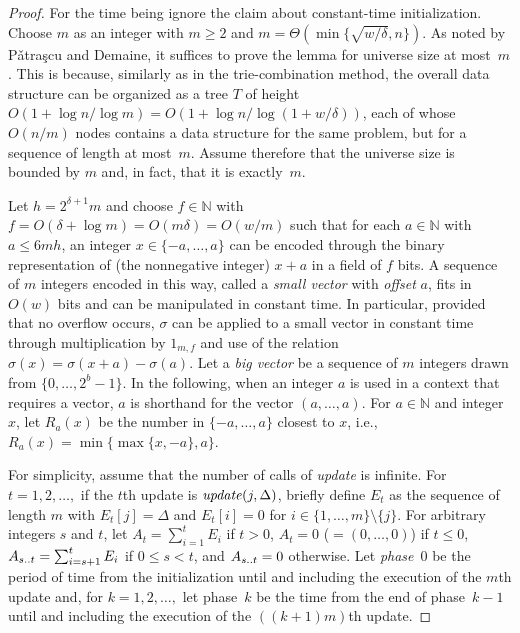 \documentclass[envcountsame,envcountsect,undated,nolinenumbers]{lnthi}
\def\Tvn#1{\hbox{\textit{#1\/}}}
\def\TbbbN{\mathbb{N}}
\def\Ttwodots{\mathinner{\ldotp\ldotp}}\def\Tsup#1{^{\mbox{\scriptsize #1}}}\gdef\Tsub#1{_{\mbox{\scriptsize #1}}}\def\cchoice{\overline{\Tvn{choice}}}
\def\Trho{R}
\begin{document}
\begin{proof}
For the time being ignore the claim about constant-time initialization.
Choose $m$ as an integer with $m\ge 2$ and
$m=\Theta(\min\{\sqrt{{w/\delta}},n\})$.
As noted by P\v atra\c scu and Demaine,
it suffices to prove the lemma for
universe size at most~$m$.
This is because,
similarly as in the trie-combination method,
the overall data structure can
be organized as a tree $T$ of height
$O(1+{{\log n}/{\log m}})=
O(1+{{\log n}/{\log(1+{w/\delta})}})$, each of whose
$O({n/m})$ nodes contains a data structure for the
same problem, but for a sequence of
length at most~$m$.
Assume therefore that
the universe size is bounded by $m$
and, in fact, that it is exactly~$m$.

Let $h=2^{\delta+1}m$
and choose $f\in\TbbbN$ with
$f=O(\delta+\log m)=O(m\delta)=O({w/m})$
such that for each $a\in\TbbbN$ with $a\le 6 m h$, an integer
$x\in\{-a,\ldots,a\}$
can be encoded through the binary
representation of (the nonnegative
integer) $x+a$ in a field
of $f$ bits.
A sequence of $m$ integers encoded in this way,
called a \emph{small vector} with \emph{offset} $a$, fits in
$O(w)$ bits and can be manipulated in constant time.
In particular, provided that no overflow occurs,
$\sigma$ can be applied to a small vector
in constant time
through multiplication by $1_{m,f}$ and use of
the relation $\sigma(x)=\sigma(x+a)-\sigma(a)$.
Let a \emph{big vector} be a sequence of $m$
integers drawn from $\{0,\ldots,2^b-1\}$.
In the following, when an integer $a$ is used
in a context that requires a vector,
$a$ is shorthand for the vector $(a,\ldots,a)$.
For $a\in\TbbbN$ and
integer $x$, let
$\Trho_a(x)$ be the number in $\{-a,\ldots,a\}$
closest to $x$, i.e., $\Trho_a(x)=\min\{\max\{x,-a\},a\}$.

For simplicity, assume that the number of
calls of \Tvn{update} is infinite.
For $t=1,2,\ldots,$ if the $t$th update
is $\Tvn{update}(j,\Delta)$, briefly define $E_t$
as the sequence of length $m$ with
$E_t[j]=\Delta$ and $E_t[i]=0$ for
$i\in\{1,\ldots,m\}\setminus\{j\}$.
For arbitrary integers $s$ and $t$,
let $A_t=\sum_{i=1}^t E_i$ if $t>0$,
$A_t=0$ ($=(0,\ldots,0)$) if $t\le 0$,
$A_{s\Ttwodots t}=\sum_{i=s+1}^t E_i$ if
$0\le s<t$, and $A_{s\Ttwodots t}=0$ otherwise.
Let \emph{phase}~0 be the period of time from the
initialization until and including the
execution of the $m$th update and,
for $k=1,2,\ldots,$ let phase~$k$
be the time from the end of phase~$k-1$
until and including the execution of
the $((k+1)m)$th update.


\end{proof}
\end{document}
